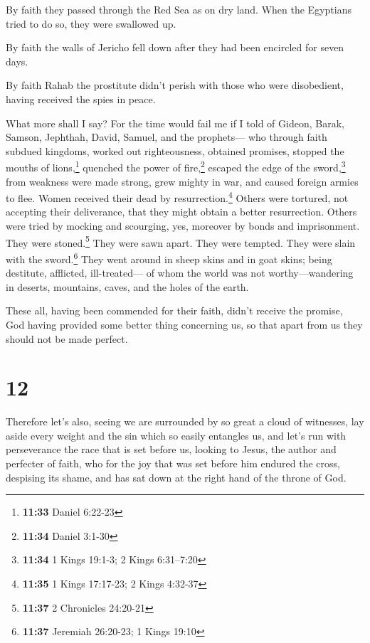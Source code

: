  By faith they passed through the Red Sea as on dry land.
When the Egyptians tried to do so, they were swallowed up.

 By faith the walls of Jericho fell down after they had
been encircled for seven days.

 By faith Rahab the prostitute didn't perish with those
who were disobedient, having received the spies in peace.

 What more shall I say? For the time would fail me if I
told of Gideon, Barak, Samson, Jephthah, David, Samuel, and the
prophets---  who through faith subdued kingdoms, worked
out righteousness, obtained promises, stopped the mouths of
lions,\footnote{\textbf{11:33} Daniel 6:22-23}  quenched
the power of fire,\footnote{\textbf{11:34} Daniel 3:1-30} escaped the
edge of the sword,\footnote{\textbf{11:34} 1 Kings 19:1-3; 2 Kings
  6:31--7:20} from weakness were made strong, grew mighty in war, and
caused foreign armies to flee.  Women received their dead
by resurrection.\footnote{\textbf{11:35} 1 Kings 17:17-23; 2 Kings
  4:32-37} Others were tortured, not accepting their deliverance, that
they might obtain a better resurrection.  Others were
tried by mocking and scourging, yes, moreover by bonds and imprisonment.
 They were stoned.\footnote{\textbf{11:37} 2 Chronicles
  24:20-21} They were sawn apart. They were tempted. They were slain
with the sword.\footnote{\textbf{11:37} Jeremiah 26:20-23; 1 Kings 19:10}
They went around in sheep skins and in goat skins; being destitute,
afflicted, ill-treated---  of whom the world was not
worthy---wandering in deserts, mountains, caves, and the holes of the
earth.

 These all, having been commended for their faith, didn't
receive the promise,  God having provided some better
thing concerning us, so that apart from us they should not be made
perfect.

\hypertarget{section-11}{%
\section{12}\label{section-11}}

 Therefore let's also, seeing we are surrounded by so
great a cloud of witnesses, lay aside every weight and the sin which so
easily entangles us, and let's run with perseverance the race that is
set before us,  looking to Jesus, the author and perfecter
of faith, who for the joy that was set before him endured the cross,
despising its shame, and has sat down at the right hand of the throne of
God.

